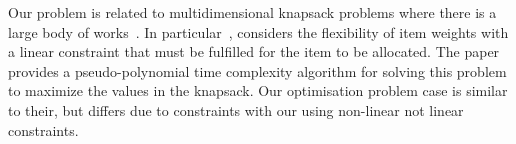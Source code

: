 Our problem is related to multidimensional knapsack problems where there is a large body of
works~\cite{knapsacks, numbers}. In particular~\cite{Nip2017}, considers the flexibility of item weights with a linear constraint that must be fulfilled for the item to be allocated. The paper provides a pseudo-polynomial time complexity algorithm for
solving this problem to maximize the values in the knapsack. Our optimisation problem case is similar to their, but
differs due to constraints with our using non-linear not linear constraints.
